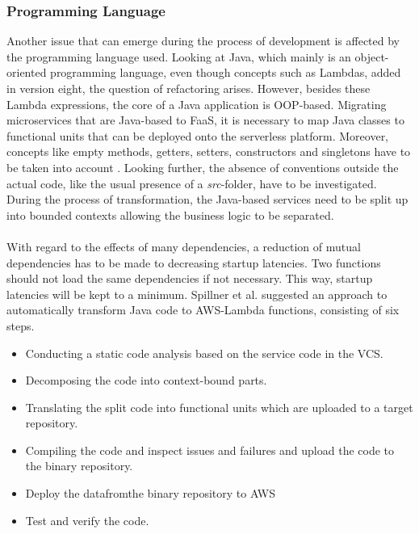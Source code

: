 \documentclass[a4paper,twoside,11pt, pagesize]{scrartcl}
\begin{document}
\begin{spacing}{1.2}
\subsubsection{Programming Language}
Another issue that can emerge during the process of development is affected by the programming language used. Looking at Java, which mainly is an object-oriented programming language, even though concepts such as Lambdas, added in version eight, the question of refactoring arises. However, besides these Lambda expressions, the core of a Java application is OOP-based. Migrating microservices that are Java-based to FaaS, it is necessary to map Java classes to functional units that can be deployed onto the serverless platform. Moreover, concepts like empty methods, getters, setters, constructors and singletons have to be taken into account \cite{spillner2017Java}. Looking further, the absence of conventions outside the actual code, like the usual presence of a \textit{src}-folder, have to be investigated. During the process of transformation, the Java-based services need to be split up into bounded contexts allowing the business logic to be separated.\\\\With regard to the effects of many dependencies, a reduction of mutual dependencies has to be made to decreasing startup latencies. Two functions should not load the same dependencies if not necessary. This way, startup latencies will be kept to a minimum. Spillner et al. suggested an approach to automatically transform Java code to AWS-Lambda functions, consisting of six steps.
\begin{itemize}
  \item[1.] Conducting a static code analysis based on the service code in the VCS.
  \item[2.] Decomposing the code into context-bound parts.
  \item[3.] Translating the split code into functional units which are uploaded to a target repository. 
  \item[4.] Compiling the code and inspect issues and failures and upload the code to the binary repository. 
  \item[5.] Deploy the datafromthe binary repository to AWS
  \item[6.] Test and verify the code.
\end{itemize}

\end{spacing}
\end{document}
